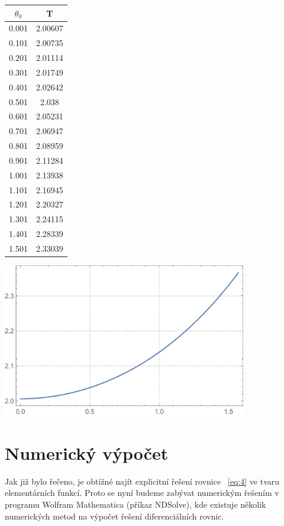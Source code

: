\documentclass[reqno, a4paper]{amsart}
\begin{document}
\begin{minipage}{\textwidth}
\begin{minipage}[b]{0.2\textwidth}
\centering
\begin{tabular}{|c|c|}
\hline
$\theta_{0}$ & T \\ 
\hline
0.001& 2.00607\\0.101& 2.00735\\0.201& 2.01114\\0.301& 2.01749\\0.401& 2.02642\\0.501& 2.038\\0.601& 2.05231\\0.701& 2.06947\\0.801& 2.08959\\0.901& 2.11284\\
1.001& 2.13938\\1.101& 2.16945\\1.201& 2.20327\\1.301& 2.24115\\1.401& 2.28339\\1.501& 2.33039\\
\hline
\end{tabular}
\end{minipage}
\begin{minipage}[b]{0.79\textwidth}
\centering
\includegraphics[width=0.8\textwidth]{Elipticky integral, Perioda}
\end{minipage}
\hfill
\end{minipage}

\section{Numerický výpočet}
Jak již bylo řečeno, je obtížné najít explicitní řešení rovnice ~\eqref{eq:4} ve tvaru elementárních funkcí. Proto se nyní budeme zabývat numerickým řešením v programu Wolfram Mathematica (příkaz NDSolve), kde existuje několik numerických metod na výpočet řešení diferenciálních rovnic.
\end{document}
